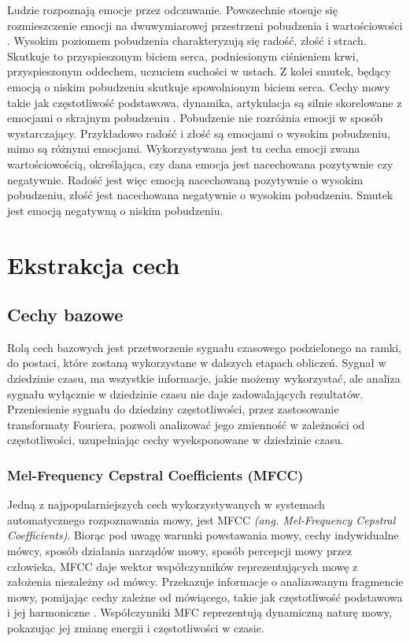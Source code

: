 \documentclass[a4paper,12pt,twoside,openany]{report}
\newcommand{\ang}[1]{\textit{(ang. #1)}}
\begin{document}
Ludzie rozpoznają emocje przez odczuwanie. 
Powszechnie stosuje się rozmieszczenie emocji na dwuwymiarowej przestrzeni pobudzenia i wartościowości \cite{Fernandez2004}.
Wysokim poziomem pobudzenia charakteryzują się radość, złość i strach. 
Skutkuje to przyspieszonym biciem serca, podniesionym ciśnieniem krwi, przyspieszonym oddechem, uczuciem suchości w ustach.
Z kolei smutek, będący emocją o niskim pobudzeniu skutkuje spowolnionym biciem serca.
Cechy mowy takie jak częstotliwość podstawowa, dynamika, artykulacja są silnie skorelowane z emocjami o skrajnym pobudzeniu \cite{Cahn1990}.
Pobudzenie nie rozróżnia emocji w sposób wystarczający. 
Przykładowo radość i złość są emocjami o wysokim pobudzeniu, mimo są różnymi emocjami.
Wykorzystywana jest tu cecha emocji zwana wartościowością, określająca, czy dana emocja jest nacechowana pozytywnie czy negatywnie.
Radość jest więc emocją nacechowaną pozytywnie o wysokim pobudzeniu, złość jest nacechowana negatywnie o wysokim pobudzeniu.
Smutek jest emocją negatywną o niskim pobudzeniu.


\section{Ekstrakcja cech}
\subsection{Cechy bazowe}
Rolą cech bazowych jest przetworzenie sygnału czasowego podzielonego na ramki,
do postaci, które zostaną wykorzystane w dalszych etapach obliczeń.
Sygnał w dziedzinie czasu, ma wszystkie informacje, jakie możemy wykorzystać, 
ale analiza sygnału wyłącznie w dziedzinie czasu nie daje zadowalających rezultatów.
Przeniesienie sygnału do dziedziny częstotliwości, przez zastosowanie transformaty Fouriera,
pozwoli analizować jego zmienność w zależności od częstotliwości, 
uzupełniając cechy wyeksponowane w dziedzinie czasu.
\subsubsection{Mel-Frequency Cepstral Coefficients (MFCC)}
Jedną z najpopularniejszych cech wykorzystywanych w systemach automatycznego rozpoznawania mowy,
jest MFCC \ang{Mel-Frequency Cepstral Coefficients}.
Biorąc pod uwagę warunki powstawania mowy, cechy indywidualne mówcy, sposób działania narządów mowy, sposób percepcji mowy przez człowieka,
MFCC daje wektor współczynników reprezentujących mowę z założenia niezależny od mówcy. 
Przekazuje informacje o analizowanym fragmencie mowy, pomijając cechy zależne od mówiącego, takie jak częstotliwość podstawowa i jej harmoniczne \cite{Hossan2013}.
Współczynniki MFC reprezentują dynamiczną naturę mowy, pokazując jej zmianę energii i częstotliwości w czasie.
\end{document}
